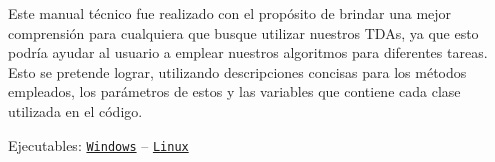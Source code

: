 \begin{center} Este manual técnico fue realizado con el propósito de brindar una mejor comprensión para cualquiera que busque utilizar nuestros T\+D\+As, ya que esto podría ayudar al usuario a emplear nuestros algoritmos para diferentes tareas. Esto se pretende lograr, utilizando descripciones concisas para los métodos empleados, los parámetros de estos y las variables que contiene cada clase utilizada en el código.   \end{center} 

\begin{center}Ejecutables\+: \href{https://github.com/fcc-2018/arboles-avl/raw/master/ejecutables/arbolAVL.exe}{\tt Windows} -- \href{https://github.com/fcc-2018/arboles-avl/raw/master/ejecutables/arbolAVL}{\tt Linux}\end{center} 

\begin{center}  \end{center}  